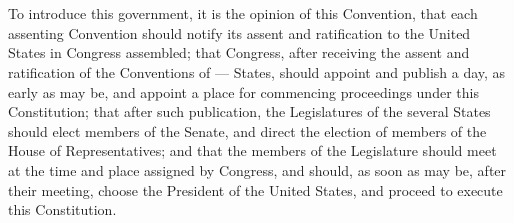\documentclass{constitution}
\begin{document}
\chapter{}
To introduce this government, it is the opinion of this Convention, that each assenting Convention should notify its assent and ratification to the United States in Congress assembled;
that Congress, after receiving the assent and ratification of the Conventions of — States,
should appoint and publish a day, as early as may be, and appoint a place for commencing proceedings under this Constitution;
that after such publication, the Legislatures of the several States should elect members of the Senate, and direct the election of members of the House of Representatives;
and that the members of the Legislature should meet at the time and place assigned by Congress, and should, as soon as may be, after their meeting, choose the President of the United States, and proceed to execute this Constitution.
\end{document}
